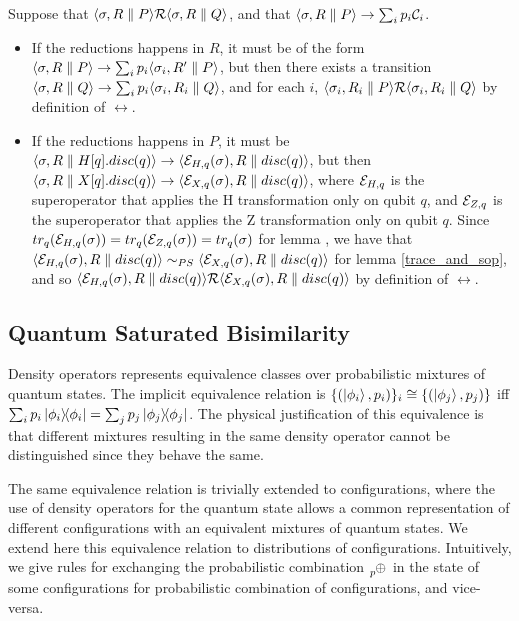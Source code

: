 Suppose that $\langle\sigma, R \parallel P\rangle \mathcal{R} \langle\sigma, R \parallel Q\rangle$, and that $\langle\sigma, R \parallel P\rangle \rightarrow \sum_i p_i \mathcal{C}_i$.\begin{itemize}
\item If the reductions happens in $R$, it must be of the form $\langle\sigma, R \parallel P\rangle \rightarrow \sum_i p_i \langle\sigma_i, R' \parallel P\rangle$, but then there exists a transition $\langle\sigma, R \parallel Q\rangle \rightarrow \sum_i p_i \langle\sigma_i, R_i \parallel Q\rangle$, and for each $i$, $\langle\sigma_i, R_i \parallel P\rangle \mathcal{R} \langle\sigma_i, R_i \parallel Q\rangle$ by definition of $\rel$.
\item If the reductions happens in $P$, it must be 
 $\langle\sigma, R \parallel H[q].disc(q)\rangle \rightarrow \langle\mathcal{E}_{H, q}(\sigma), R \parallel disc(q)\rangle$, but then  $\langle\sigma, R \parallel X[q].disc(q)\rangle \rightarrow \langle\mathcal{E}_{X, q}(\sigma), R \parallel disc(q)\rangle$, where $\mathcal{E}_{H, q}$ is the superoperator that applies the H transformation only on qubit $q$, and $\mathcal{E}_{Z, q}$ is the superoperator that applies the Z transformation only on qubit $q$. 
Since $tr_q(\mathcal{E}_{H, q}(\sigma)) = tr_q(\mathcal{E}_{Z, q}(\sigma)) = tr_q(\sigma)$ for lemma , we have that $\langle\mathcal{E}_{H, q}(\sigma), R \parallel disc(q)\rangle \sim_{PS} \langle\mathcal{E}_{X, q}(\sigma), R \parallel disc(q)\rangle$ for lemma \ref{trace_and_sop}, and so $\langle\mathcal{E}_{H, q}(\sigma), R \parallel disc(q)\rangle \mathcal{R} \langle\mathcal{E}_{X, q}(\sigma), R \parallel disc(q)\rangle$ by definition of $\rel$.
 
\end{itemize}

\subsection{Quantum Saturated Bisimilarity}

Density operators represents equivalence classes over probabilistic mixtures of quantum states.
The implicit equivalence relation is $\{(\ket{\phi_i}, p_i)\}_i \cong \{(\ket{\phi_j}, p_j)\}$ iff $\sum_{i} p_i \ket{\phi_i}\!\!\bra{\phi_i} = \sum_{j} p_j \ket{\phi_j}\!\!\bra{\phi_j}$.
The physical justification of this equivalence is that different mixtures resulting in the same density operator cannot be distinguished since they behave the same.

The same equivalence relation is trivially extended to configurations, where the use of density operators for the quantum state allows a common representation of different configurations with an equivalent mixtures of quantum states. 
We extend here this equivalence relation to distributions of configurations.
Intuitively, we give rules for exchanging the probabilistic combination $\psum{p}$ in the state of some configurations for probabilistic combination of configurations, and vice-versa. 

